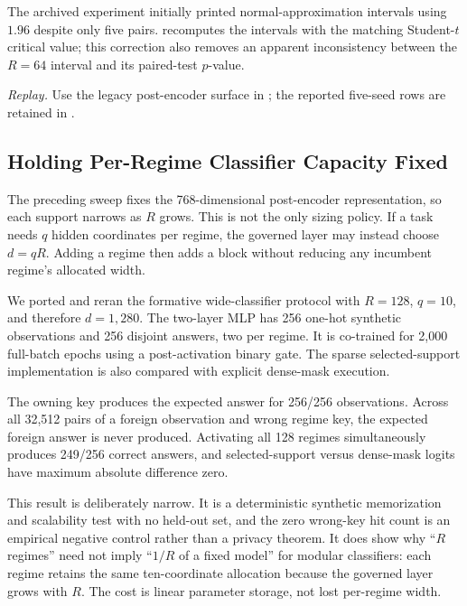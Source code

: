 \documentclass[11pt,a4paper]{article}
\begin{document}
The archived experiment initially printed normal-approximation
intervals using $1.96$ despite only five pairs.  
recomputes the intervals with the matching Student-$t$ critical value;
this correction also removes an apparent inconsistency between the
$R{=}64$ interval and its paired-test $p$-value.

\begin{sloppypar}
\noindent\textit{Replay.} Use the legacy post-encoder surface in
; the reported
five-seed rows are retained in
.
\end{sloppypar}

\subsection{Holding Per-Regime Classifier Capacity Fixed}
\label{sec:capacity-preserving-classifier}

The preceding sweep fixes the 768-dimensional post-encoder
representation, so each support narrows as $R$ grows.  This is not the
only sizing policy.  If a task needs $q$ hidden coordinates per regime,
the governed layer may instead choose $d=qR$.  Adding a regime then
adds a block without reducing any incumbent regime's allocated width.

We ported and reran the formative wide-classifier protocol with
$R{=}128$, $q{=}10$, and therefore $d{=}1{,}280$.  The two-layer MLP
has 256 one-hot synthetic observations and 256 disjoint answers, two
per regime.  It is co-trained for 2,000 full-batch epochs using a
post-activation binary gate.  The sparse selected-support
implementation is also compared with explicit dense-mask execution.

The owning key produces the expected answer for 256/256 observations.
Across all 32,512 pairs of a foreign observation and wrong regime key,
the expected foreign answer is never produced.  Activating all 128
regimes simultaneously produces 249/256 correct answers, and
selected-support versus dense-mask logits have maximum absolute
difference zero.

This result is deliberately narrow.  It is a deterministic synthetic
memorization and scalability test with no held-out set, and the zero
wrong-key hit count is an empirical negative control rather than a
privacy theorem.  It does show why ``$R$ regimes'' need not imply
``$1/R$ of a fixed model'' for modular classifiers: each regime retains
the same ten-coordinate allocation because the governed layer grows
with $R$.  The cost is linear parameter storage, not lost per-regime
width.
\end{document}
